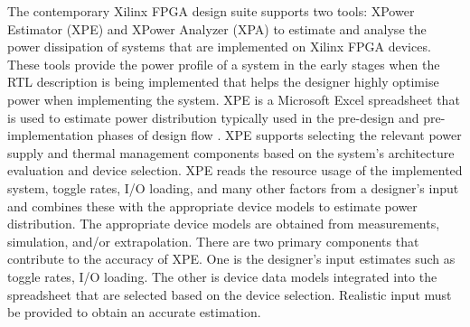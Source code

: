 %
%

The contemporary Xilinx FPGA design suite supports two tools: XPower Estimator (XPE) and  XPower Analyzer (XPA) to estimate and analyse the power dissipation of systems that are implemented on Xilinx FPGA devices.
These tools provide the power profile of a system in the early stages when the RTL description is being implemented that helps the designer highly optimise power when implementing the system.
XPE is a Microsoft Excel spreadsheet that is used to estimate power distribution typically used in the pre-design and pre-implementation phases of design flow \cite{XPowerEstimator2011} . 
XPE supports selecting the relevant power supply and thermal management components based on the system's architecture evaluation and device selection.
XPE reads the resource usage of the implemented system, toggle rates, I/O loading, and many other factors from a designer's input and combines these with the appropriate device models to estimate power distribution. 
The appropriate device models are obtained from measurements, simulation, and/or extrapolation.
There are two primary components that contribute to the accuracy of XPE. 
One is the designer's input estimates such as toggle rates, I/O loading.
The other is device data models integrated into the spreadsheet that are selected based on the device selection.
Realistic input must be provided to obtain an accurate estimation.

